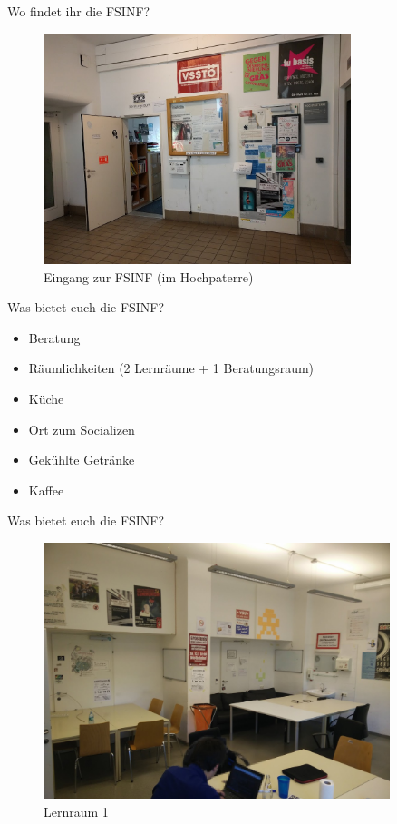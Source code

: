 \documentclass{beamer}
\begin{document}
\begin{frame}{Wo findet ihr die FSINF?}
    \begin{figure}[htp]
        \centering
        \includegraphics[width=0.8\textwidth]{eingang.jpg}
        \caption{Eingang zur FSINF (im Hochpaterre)}
    \end{figure}
\end{frame}

\begin{frame}{Was bietet euch die FSINF?}
    \begin{itemize}
        \item Beratung
        \item Räumlichkeiten (2 Lernräume + 1 Beratungsraum)
        \item Küche
        \item Ort zum Socializen
        \item Gekühlte Getränke
        \item Kaffee
    \end{itemize}
\end{frame}

\begin{frame}{Was bietet euch die FSINF?}
    \begin{figure}[htp]
        \centering
        \includegraphics[width=0.9\textwidth]{lernraum.jpg}
        \caption{Lernraum 1}
    \end{figure}
\end{frame}
\end{document}
